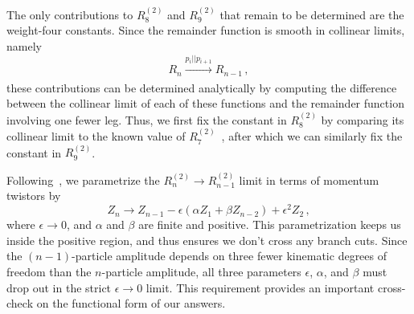 \documentclass[11pt]{article}
\begin{document}
The only contributions to $R_8^{(2)}$\! and $R_9^{(2)}$\! that remain to be determined are the weight-four constants. Since the remainder function is smooth in collinear limits, namely
\begin{equation} \label{eq:remainder_smooth_collinear_limits}
R_n \xrightarrow[]{p_i || p_{i+1}} R_{n-1} \, ,
\end{equation} 
these contributions can be determined analytically by computing the difference between the collinear limit of each of these functions and the remainder function involving one fewer leg. Thus, we first fix the constant in $R_8^{(2)}$\! by comparing its collinear limit to the known value of $R_7^{(2)}$\!~\cite{Golden:2014xqf}, after which we can similarly fix the constant in $R_9^{(2)}$\!. 


Following~\cite{CaronHuot:2011ky}, we parametrize the $R_n^{(2)} \to R_{n-1}^{(2)}$ limit in terms of momentum twistors by
\begin{equation} \label{eq:collinear_parametrization}
Z_n \to Z_{n-1} - \epsilon (\alpha Z_1 + \beta Z_{n-2}) + \epsilon^2 Z_2 \, ,
\end{equation}
where $\epsilon \to 0$, and $\alpha$ and $\beta$ are finite and positive. This parametrization keeps us inside the positive region, and thus ensures we don't cross any branch cuts. Since the $(n{-}1)$-particle amplitude depends on three fewer kinematic degrees of freedom than the $n$-particle amplitude, all three parameters $\epsilon$, $\alpha$, and $\beta$ must drop out in the strict $\epsilon \to 0$ limit. This requirement provides an important cross-check on the functional form of our answers.
\end{document}
